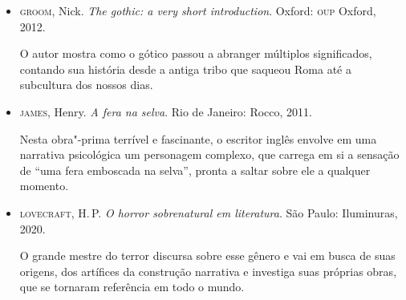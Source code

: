 \documentclass[12pt]{extarticle}
\begin{document}
\begin{itemize}
\item \textsc{groom}, Nick. \textit{The gothic: a very short introduction}. Oxford: \textsc{oup} Oxford, 2012.

O autor mostra como o gótico passou a abranger múltiplos significados,
contando sua história desde a antiga tribo que saqueou Roma até a
subcultura dos nossos dias.

\item\textsc{james}, Henry. \textit{A fera na selva}. Rio de Janeiro: Rocco, 2011.

Nesta obra"-prima terrível e fascinante, o escritor inglês envolve em uma
narrativa psicológica um personagem complexo, que carrega em si a
sensação de ``uma fera emboscada na selva'', pronta a saltar sobre ele a
qualquer momento.

\item \textsc{lovecraft}, H.\,P. \textit{O horror sobrenatural em literatura}. São Paulo: Iluminuras, 2020.

O grande mestre do terror discursa sobre esse gênero e vai em busca de
suas origens, dos artífices da construção narrativa e investiga suas
próprias obras, que se tornaram referência em todo o mundo.


\end{itemize}
\end{document}
